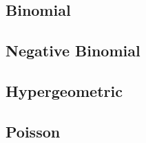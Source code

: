 
\subsection{Binomial}
\subsection{Negative Binomial}
\subsection{Hypergeometric}
\subsection{Poisson}
